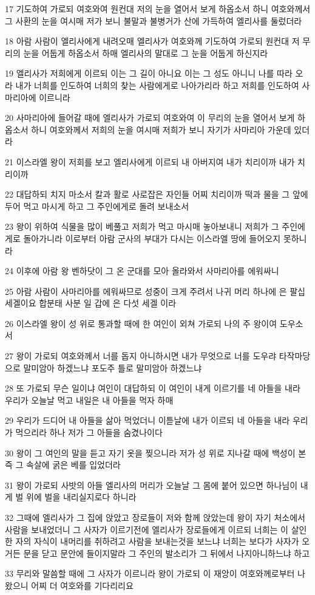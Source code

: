 \par 17 기도하여 가로되 여호와여 원컨대 저의 눈을 열어서 보게 하옵소서 하니 여호와께서 그 사환의 눈을 여시매 저가 보니 불말과 불병거가 산에 가득하여 엘리사를 둘렀더라
\par 18 아람 사람이 엘리사에게 내려오매 엘리사가 여호와께 기도하여 가로되 원컨대 저 무리의 눈을 어둡게 하옵소서 하매 엘리사의 말대로 그 눈을 어둡게 하신지라
\par 19 엘리사가 저희에게 이르되 이는 그 길이 아니요 이는 그 성도 아니니 나를 따라 오라 내가 너희를 인도하여 너희의 찾는 사람에게로 나아가리라 하고 저희를 인도하여 사마리아에 이르니라
\par 20 사마리아에 들어갈 때에 엘리사가 가로되 여호와여 이 무리의 눈을 열어서 보게 하옵소서 하니 여호와께서 저희의 눈을 여시매 저희가 보니 자기가 사마리아 가운데 있더라
\par 21 이스라엘 왕이 저희를 보고 엘리사에게 이르되 내 아버지여 내가 치리이까 내가 치리이까
\par 22 대답하되 치지 마소서 칼과 활로 사로잡은 자인들 어찌 치리이까 떡과 물을 그 앞에 두어 먹고 마시게 하고 그 주인에게로 돌려 보내소서
\par 23 왕이 위하여 식물을 많이 베풀고 저희가 먹고 마시매 놓아보내니 저희가 그 주인에게로 돌아가니라 이로부터 아람 군사의 부대가 다시는 이스라엘 땅에 들어오지 못하니라
\par 24 이후에 아람 왕 벤하닷이 그 온 군대를 모아 올라와서 사마리아를 에워싸니
\par 25 아람 사람이 사마리아를 에워싸므로 성중이 크게 주려서 나귀 머리 하나에 은 팔십 세겔이요 합분태 사분 일 갑에 은 다섯 세겔 이라
\par 26 이스라엘 왕이 성 위로 통과할 때에 한 여인이 외쳐 가로되 나의 주 왕이여 도우소서
\par 27 왕이 가로되 여호와께서 너를 돕지 아니하시면 내가 무엇으로 너를 도우랴 타작마당으로 말미암아 하겠느냐 포도주 틀로 말미암아 하겠느냐
\par 28 또 가로되 무슨 일이냐 여인이 대답하되 이 여인이 내게 이르기를 네 아들을 내라 우리가 오늘날 먹고 내일은 내 아들을 먹자 하매
\par 29 우리가 드디어 내 아들을 삶아 먹었더니 이튿날에 내가 이르되 네 아들을 내라 우리가 먹으리라 하나 저가 그 아들을 숨겼나이다
\par 30 왕이 그 여인의 말을 듣고 자기 옷을 찢으니라 저가 성 위로 지나갈 때에 백성이 본즉 그 속살에 굵은 베를 입었더라
\par 31 왕이 가로되 사밧의 아들 엘리사의 머리가 오늘날 그 몸에 붙어 있으면 하나님이 내게 벌 위에 벌을 내리실지로다 하니라
\par 32 그때에 엘리사가 그 집에 앉았고 장로들이 저와 함께 앉았는데 왕이 자기 처소에서 사람을 보내었더니 그 사자가 이르기전에 엘리사가 장로들에게 이르되 너희는 이 살인한 자의 자식이 내머리를 취하려고 사람을 보내는것을 보느냐 너희는 보다가 사자가 오거든 문을 닫고 문안에 들이지말라 그 주인의 발소리가 그 뒤에서 나지아니하느냐 하고
\par 33 무리와 말씀할 때에 그 사자가 이르니라 왕이 가로되 이 재앙이 여호와께로부터 나왔으니 어찌 더 여호와를 기다리리요

